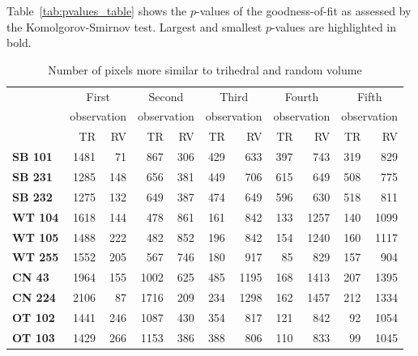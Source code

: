 \documentclass[12pt]{article}
\begin{document}
Table~\ref{tab:pvalues_table} shows the $p$-values of the goodness-of-fit as assessed by the Komolgorov-Smirnov test. 
Largest and smallest $p$-values are highlighted in bold.

\begin{table}[hbt]
\centering
\caption{Number of pixels more similar to trihedral and random volume}\label{tab:size_sample}
\begin{tabular}{lrrrrrrrrrr}
\toprule
& \multicolumn{2}{c}{First} & \multicolumn{2}{c}{Second} & \multicolumn{2}{c}{Third} & \multicolumn{2}{c}{Fourth} & \multicolumn{2}{c}{Fifth}\\
& \multicolumn{2}{c}{observation} & \multicolumn{2}{c}{observation} & \multicolumn{2}{c}{observation} & \multicolumn{2}{c}{observation} & \multicolumn{2}{c}{observation}\\
& TR & RV & TR & RV & TR & RV & TR & RV& TR & RV\\
\cmidrule(lr){2-11}
\textbf{SB 101} & 1481 & 71 & 867 & 306 & 429 & 633 & 397 & 743 & 319 & 829\\
\textbf{SB 231} & 1285 & 148 & 656 & 381 & 449 & 706 & 615 & 649 & 508 & 775\\
\textbf{SB 232} & 1275 & 132 & 649 & 387 & 474 & 649 & 596 & 630 & 518 & 811\\
\textbf{WT 104} & 1618 & 144 & 478 & 861 & 161 & 842 & 133 & 1257 & 140 & 1099\\
\textbf{WT 105} & 1488 & 222 & 482 & 852 & 196 & 842 & 154 & 1240 & 160 & 1117\\
\textbf{WT 255} & 1552 & 205 & 567 & 746 & 180 & 917 & 85 & 829 & 157 & 904\\
\textbf{CN 43}  & 1964 & 155 & 1002 & 625 & 485 & 1195 & 168 & 1413 & 207 & 1395\\
\textbf{CN 224} & 2106 & 87 & 1716 & 209 & 234 & 1298 & 162 & 1457 & 212 & 1334\\
\textbf{OT 102} & 1441 & 246 & 1087 & 430 & 354 & 817 & 121 & 842 & 92 & 1054\\
\textbf{OT 103} & 1429 & 266 & 1153 & 386 & 388 & 806 & 110 & 833 & 99 & 1045\\
\bottomrule
\end{tabular} 
\end{table}
\end{document}
